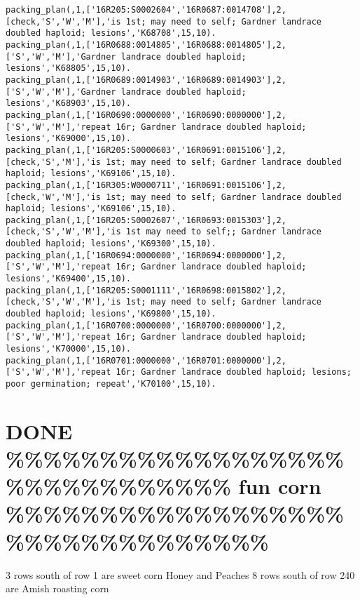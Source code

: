 \documentclass[11pt]{article}
\begin{document}
\begin{verbatim}
packing_plan(,1,['16R205:S0002604','16R0687:0014708'],2,[check,'S','W','M'],'is 1st; may need to self; Gardner landrace doubled haploid; lesions','K68708',15,10).
packing_plan(,1,['16R0688:0014805','16R0688:0014805'],2,['S','W','M'],'Gardner landrace doubled haploid; lesions','K68805',15,10).
packing_plan(,1,['16R0689:0014903','16R0689:0014903'],2,['S','W','M'],'Gardner landrace doubled haploid; lesions','K68903',15,10).
packing_plan(,1,['16R0690:0000000','16R0690:0000000'],2,['S','W','M'],'repeat 16r; Gardner landrace doubled haploid; lesions','K69000',15,10).
packing_plan(,1,['16R205:S0000603','16R0691:0015106'],2,[check,'S','M'],'is 1st; may need to self; Gardner landrace doubled haploid; lesions','K69106',15,10).
packing_plan(,1,['16R305:W0000711','16R0691:0015106'],2,[check,'W','M'],'is 1st; may need to self; Gardner landrace doubled haploid; lesions','K69106',15,10).
packing_plan(,1,['16R205:S0002607','16R0693:0015303'],2,[check,'S','W','M'],'is 1st may need to self;; Gardner landrace doubled haploid; lesions','K69300',15,10).
packing_plan(,1,['16R0694:0000000','16R0694:0000000'],2,['S','W','M'],'repeat 16r; Gardner landrace doubled haploid; lesions','K69400',15,10).
packing_plan(,1,['16R205:S0001111','16R0698:0015802'],2,[check,'S','W','M'],'is 1st; may need to self; Gardner landrace doubled haploid; lesions','K69800',15,10).
packing_plan(,1,['16R0700:0000000','16R0700:0000000'],2,['S','W','M'],'repeat 16r; Gardner landrace doubled haploid; lesions','K70000',15,10).
packing_plan(,1,['16R0701:0000000','16R0701:0000000'],2,['S','W','M'],'repeat 16r; Gardner landrace doubled haploid; lesions; poor germination; repeat','K70100',15,10).
\end{verbatim}


\section{{\bfseries\sffamily DONE} \%\%\%\%\%\%\%\%\%\%\%\%\%\%\%\%\%\%\%\%\%\%\%\%\%\%\%\%\%\% fun corn \%\%\%\%\%\%\%\%\%\%\%\%\%\%\%\%\%\%\%\%\%\%\%\%\%\%\%\%\%\%\%\%}
\label{sec-7}

3 rows south of row 1 are sweet corn Honey and Peaches
8 rows south of row 240 are Amish roasting corn
\end{document}
